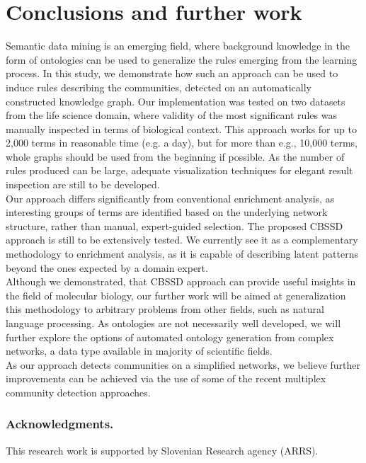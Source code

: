 \documentclass[oribibl,runningheads,a4paper]{llncs}
\begin{document}
\section{Conclusions and further work}
Semantic data mining is an emerging field, where background knowledge in the form of ontologies can be used to generalize the rules emerging from the learning process. In this study, we demonstrate how such an approach can be used to induce rules describing the communities, detected on an automatically constructed knowledge graph. Our implementation was tested on two datasets from the life science domain, where validity of the most significant rules was manually inspected in terms of biological context. This approach works for up to 2,000 terms in reasonable time (e.g. a day), but for more than e.g., 10,000 terms, whole graphs should be used from the beginning if possible. As the number of rules produced can be large, adequate visualization techniques for elegant result inspection are still to be developed. \\
Our approach differs significantly from conventional enrichment analysis, as interesting groups of terms are identified based on the underlying network structure, rather than manual, expert-guided selection. The proposed CBSSD approach is still to be extensively tested. We currently see it as a complementary methodology to enrichment analysis, as it is capable of describing latent patterns beyond the ones expected by a domain expert. \\
Although we demonstrated, that CBSSD approach can provide useful insights in the field of molecular biology, our further work will be aimed at generalization this methodology to arbitrary problems from other fields, such as natural language processing. As ontologies are not necessarily well developed, we will further explore the options of automated ontology generation from complex networks, a data type available in majority of scientific fields.\\
As our approach detects communities on a simplified networks, we believe further improvements can be achieved via the use of some of the recent multiplex community detection approaches.

\subsubsection*{Acknowledgments.} 

This research work is supported by Slovenian Research agency (ARRS).

 

\end{document}
